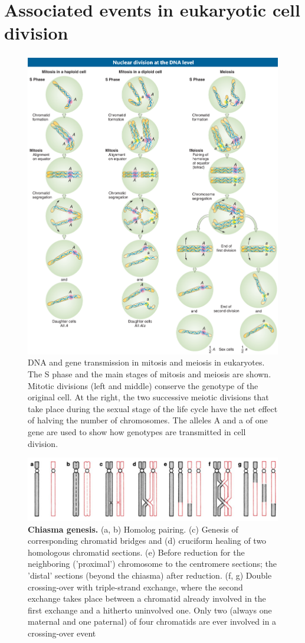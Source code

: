 \documentclass[11pt,ignorenonframetext,aspectratio=169]{beamer}
\begin{document}
\hypertarget{associated-events-in-eukaryotic-cell-division}{%
\section{Associated events in eukaryotic cell
division}\label{associated-events-in-eukaryotic-cell-division}}

\begin{frame}{}
\protect\hypertarget{section-11}{}
\begin{figure}

{\centering \includegraphics[width=0.45\linewidth]{../images/nuclear_division_dna} 

}

\caption{DNA and gene transmission in mitosis and meiosis in eukaryotes. The S phase and the main stages of mitosis and meiosis are shown. Mitotic divisions (left and middle) conserve the genotype of the original cell. At the right, the two successive meiotic divisions that take place during the sexual stage of the life cycle have the net effect of halving the number of chromosomes. The alleles A and a of one gene are used to show how genotypes are transmitted in cell division.}\label{fig:nuclear-division-dna}
\end{figure}
\end{frame}

\begin{frame}{}
\protect\hypertarget{section-12}{}
\begin{figure}
\includegraphics[width=0.65\linewidth]{../images/chiasma_genesis} \caption{\textbf{Chiasma genesis.} (a, b) Homolog pairing. (c) Genesis of corresponding chromatid bridges and (d) cruciform healing of two homologous chromatid sections. (e) Before reduction for the neighboring ('proximal') chromosome to the centromere sections; the 'distal' sections (beyond the chiasma) after reduction. (f, g) Double crossing-over with triple-strand exchange, where the second exchange takes place between a chromatid already involved in the first exchange and a hitherto uninvolved one. Only two (always one maternal and one paternal) of four chromatids are ever involved in a crossing-over event}\label{fig:chiasmata-structure}
\end{figure}
\end{frame}
\end{document}

